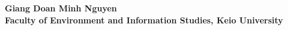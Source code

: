 \begin{flushright}
{\bf Giang Doan Minh Nguyen}\\
\vspace{-2mm}
{\bf Faculty of Environment and Information Studies, Keio University}\\
\end{flushright}




